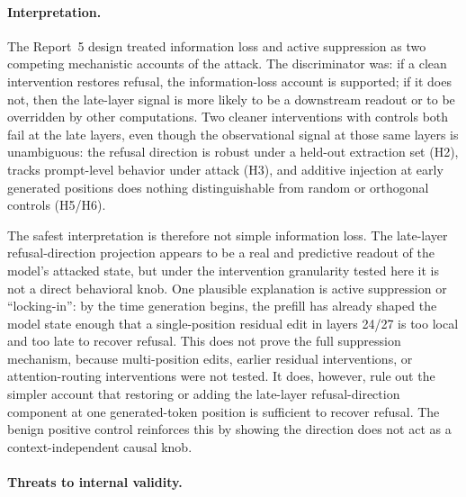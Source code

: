 \documentclass{article}
\begin{document}
\paragraph{Interpretation.}
The Report~5 design treated information loss and active suppression as
two competing mechanistic accounts of the attack. The discriminator was:
if a clean intervention restores refusal, the information-loss account
is supported; if it does not, then the late-layer signal is more likely
to be a downstream readout or to be overridden by other computations.
Two cleaner interventions with controls both fail at the late layers,
even though the observational signal at those same layers is unambiguous:
the refusal direction is robust under a held-out extraction set (H2),
tracks prompt-level behavior under attack (H3), and additive injection
at early generated positions does nothing distinguishable from random or
orthogonal controls (H5/H6).

The safest interpretation is therefore not simple information loss. The
late-layer refusal-direction projection appears to be a real and
predictive readout of the model's attacked state, but under the
intervention granularity tested here it is not a direct behavioral knob.
One plausible explanation is active suppression or ``locking-in'': by
the time generation begins, the prefill has already shaped the model
state enough that a single-position residual edit in layers 24/27 is too
local and too late to recover refusal. This does not prove the full
suppression mechanism, because multi-position edits, earlier residual
interventions, or attention-routing interventions were not tested. It
does, however, rule out the simpler account that restoring or adding the
late-layer refusal-direction component at one generated-token position
is sufficient to recover refusal. The benign positive control reinforces
this by showing the direction does not act as a context-independent
causal knob.

\paragraph{Threats to internal validity.}
\end{document}
